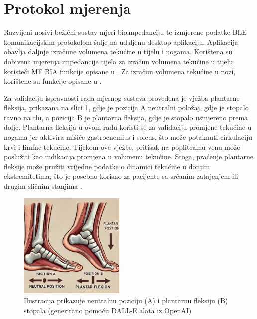 \documentclass[../diplomski_rad.tex]{subfiles}
\begin{document}
\section{Protokol mjerenja}

Razvijeni nosivi bežični sustav mjeri bioimpedanciju te izmjerene podatke BLE komunikacijskim protokolom šalje na udaljenu desktop aplikaciju. 
Aplikacija obavlja daljnje izračune volumena tekućine u tijelu i nogama. 
Korištena su dobivena mjerenja impedancije tijela za izračun volumena tekućine u tijelu koristeći MF BIA funkcije opisane u \cite{Sanchez2013}. 
Za izračun volumena tekućine u nozi, korištene su funkcije opisane u \cite{Delano2022}.

Za validaciju ispravnosti rada mjernog sustava provedena je vježba plantarne fleksija, 
prikazana na slici \ref{slk:plantarna_fleksija}, gdje je pozicija A neutralni položaj, 
gdje je stopalo ravno na tlu, a pozicija B je plantarna fleksija, gdje je stopalo usmjereno prema dolje. 
Plantarna fleksija u ovom radu koristi se za validaciju promjene tekućine u nogama jer aktivira 
mišiće gastrocnemius i soleus, što može potaknuti cirkulaciju krvi i limfne tekućine. 
Tijekom ove vježbe, pritisak na poplitealnu venu može poslužiti kao indikacija promjena u volumenu tekućine. 
Stoga, praćenje plantarne fleksije može pružiti vrijedne podatke o dinamici tekućine u donjim ekstremitetima, 
što je posebno korisno za pacijente sa srčanim zatajenjem ili drugim sličnim stanjima \cite{AVILADEOLIVEIRA2022102625}. 

\begin{figure}[htb]
    \centering
    \includegraphics[width=0.45\textwidth]{Figures/plantarna_fleksija.jpg} 
    \caption{Ilustracija prikazuje neutralnu poziciju (A) i plantarnu fleksiju (B) stopala \newline (generirano pomoću DALL-E alata iz OpenAI)
    }
    \label{slk:plantarna_fleksija}
\end{figure}
\end{document}
